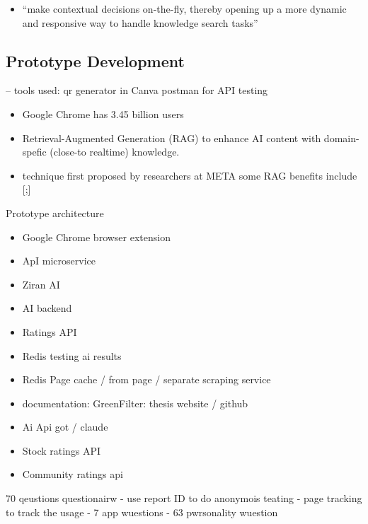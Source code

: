 \documentclass[
  letterpaper,
  DIV=11,
  numbers=noendperiod]{scrartcl}
\providecommand{\tightlist}{%
  \setlength{\itemsep}{0pt}\setlength{\parskip}{0pt}}\usepackage{longtable,booktabs,array}
\begin{document}
\begin{itemize}
\tightlist
\item
  ``make contextual decisions on-the-fly, thereby opening up a more
  dynamic and responsive way to handle knowledge search tasks''
  \citet{dewyBuildingRAGTool2024}
\end{itemize}

\subsection{Prototype Development}\label{prototype-development}

-- tools used: qr generator in Canva postman for API testing

\begin{itemize}
\item
  Google Chrome has 3.45 billion users
  \citet{GoogleChromeStatistics2023}
\item
  Retrieval-Augmented Generation (RAG) to enhance AI content with
  domain-spefic (close-to realtime) knowledge.
\item
  technique first proposed by researchers at META
  \citep{lewisRetrievalAugmentedGenerationKnowledgeIntensive2020} some
  RAG benefits include
  {[}\citet{gaoRetrievalAugmentedGenerationLarge2023};{]}
\end{itemize}

Prototype architecture

\begin{itemize}
\item
  Google Chrome browser extension
\item
  ApI microservice
\item
  Ziran AI
\item
  AI backend
\item
  Ratings API
\item
  Redis testing ai results
\item
  Redis Page cache / from page / separate scraping service
\item
  documentation: GreenFilter: thesis website / github
\item
  Ai Api got / claude
\item
  Stock ratings API
\item
  Community ratings api
\end{itemize}

70 qeustions questionairw - use report ID to do anonymois teating - page
tracking to track the usage - 7 app wuestions - 63 pwrsonality wuestion
\end{document}

